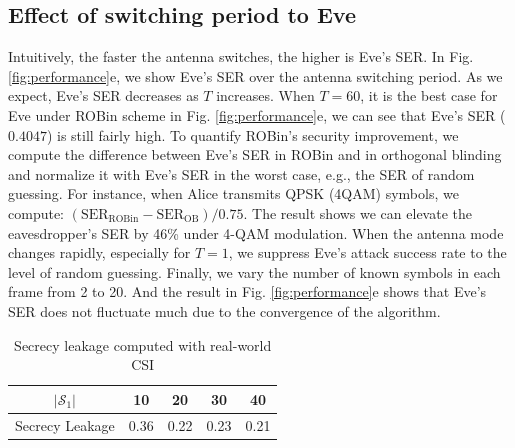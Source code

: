 
\subsection{Effect of switching period to Eve}
Intuitively, the faster the antenna switches, the higher is Eve's SER. In Fig. \ref{fig:performance}e, we show Eve's SER over the antenna switching period. As we expect, Eve's SER decreases as $T$ increases. When $T = 60$, it is the best case for Eve under ROBin scheme in Fig. \ref{fig:performance}e, we can see that Eve's SER ($0.4047$) is still fairly high. To quantify ROBin's security improvement, we compute the difference between Eve's SER in ROBin and in orthogonal blinding and normalize it with Eve's SER in the worst case, e.g., the SER of random guessing. For instance, when Alice transmits QPSK (4QAM) symbols, we compute: $(\text{SER}_{\text{ROBin}}-\text{SER}_{\text{OB}})/0.75$. The result shows we can elevate the eavesdropper's SER by 46\% under 4-QAM modulation. When the antenna mode changes rapidly, especially for $T = 1$, we suppress Eve's attack success rate to the level of random guessing. Finally, we vary the number of known symbols in each frame from 2 to 20. And the result in Fig. \ref{fig:performance}e shows that Eve's SER does not fluctuate much due to the convergence of the algorithm.




\begin{table}[t]
    \centering
    \caption{Secrecy leakage computed with real-world CSI}
    \begin{tabular}{|c|c|c|c|c|}
        \hline
        $|\mathcal{S}_1|$ & 10 & 20 & 30 & 40 \\
        \hline
        Secrecy Leakage & 0.36 & 0.22 & 0.23 & 0.21\\
        \hline
    \end{tabular}
    \label{tab:I}
\end{table}

